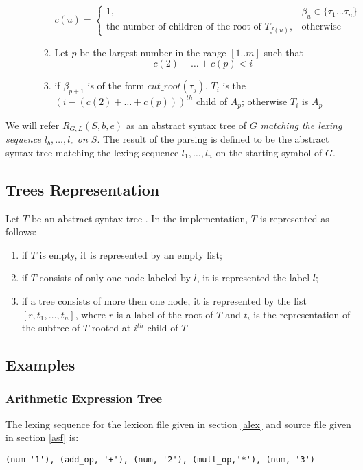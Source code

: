 \documentclass[a4paper,10pt]{article}
\begin{document}
\begin{enumerate}
\begin{itemize}
\begin{enumerate}
\[
c(u) = 
\begin{cases}
             1,& \beta_u \in \{\tau_1 \dots \tau_n\} \\
  \text{the number of children of the root of } T_{f(u)},          & \text{otherwise}
\end{cases}
\]
\item Let $p$ be the largest number in the range $[1..m]$ such that $$c(2) + \ldots + c(p) < i$$
\item if $\beta_{p+1}$ is of the form $cut\_root(\tau_j)$, $T_i$ is the $(i - (c(2) + \ldots + c(p)))^{th}$ child of $A_p$;
      otherwise $T_i$ is $A_p$

 \end{enumerate}
 \end{itemize}
 \end{enumerate}

We will refer  $R_{G,L}(S,b,e)$ as  an abstract syntax tree of $G$ \textit{matching the lexing sequence $l_b, \ldots, l_e$ on $S$}. 
The result of the parsing is defined to be the abstract syntax tree matching the lexing sequence $l_1, \ldots, l_n$ on the starting symbol of $G$.  


\subsection{Trees Representation}
Let $T$ be an abstract syntax tree .
In the implementation, $T$ is  represented as follows:
\begin{enumerate}
\item if $T$ is empty, it is represented by an empty list;
\item if $T$ consists of only one node labeled by $l$, it is represented the label $l$;
\item if a tree consists of more then one node, it is represented by the list $[r,t_1,\ldots,t_n]$, where $r$ is a label of the root of $T$ and  $t_i$ is the representation of the subtree of $T$ rooted at $i^{th}$ child of $T$ 
\end{enumerate}

\subsection{Examples}
\subsubsection{Arithmetic Expression Tree}

The lexing sequence for the  lexicon file given in section \ref{alex} and source file given in section \ref{asf} is:
\begin{verbatim}
(num '1'), (add_op, '+'), (num, '2'), (mult_op,'*'), (num, '3') 
\end{verbatim}
\end{document}
